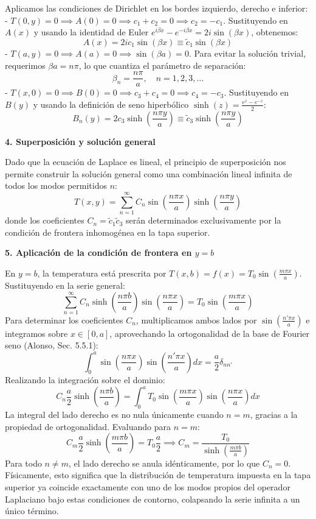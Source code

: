 \documentclass[a4paper]{article}
\begin{document}
Aplicamos las condiciones de Dirichlet en los bordes izquierdo, derecho e inferior:
- $T(0, y) = 0 \implies A(0) = 0 \implies c_1 + c_2 = 0 \implies c_2 = -c_1$.
Sustituyendo en $A(x)$ y usando la identidad de Euler $e^{i\beta x} - e^{-i\beta x} = 2i\sin(\beta x)$, obtenemos:
$$ A(x) = 2ic_1 \sin(\beta x) \equiv \tilde{c}_1 \sin(\beta x) $$
- $T(a, y) = 0 \implies A(a) = 0 \implies \sin(\beta a) = 0$.
Para evitar la solución trivial, requerimos $\beta a = n\pi$, lo que cuantiza el parámetro de separación:
$$ \beta_n = \frac{n\pi}{a}, \quad n = 1, 2, 3, \dots $$
- $T(x, 0) = 0 \implies B(0) = 0 \implies c_3 + c_4 = 0 \implies c_4 = -c_3$.
Sustituyendo en $B(y)$ y usando la definición de seno hiperbólico $\sinh(z) = \frac{e^z - e^{-z}}{2}$:
$$ B_n(y) = 2c_3 \sinh\left(\frac{n\pi y}{a}\right) \equiv \tilde{c}_3 \sinh\left(\frac{n\pi y}{a}\right) $$

\textbf{4. Superposición y solución general}

Dado que la ecuación de Laplace es lineal, el principio de superposición nos permite construir la solución general como una combinación lineal infinita de todos los modos permitidos $n$:
$$ T(x, y) = \sum_{n=1}^\infty C_n \sin\left(\frac{n\pi x}{a}\right) \sinh\left(\frac{n\pi y}{a}\right) $$
donde los coeficientes $C_n = \tilde{c}_1 \tilde{c}_3$ serán determinados exclusivamente por la condición de frontera inhomogénea en la tapa superior.

\textbf{5. Aplicación de la condición de frontera en $y=b$}

En $y=b$, la temperatura está prescrita por $T(x, b) = f(x) = T_0 \sin\left(\frac{m\pi x}{a}\right)$. Sustituyendo en la serie general:
$$ \sum_{n=1}^\infty C_n \sinh\left(\frac{n\pi b}{a}\right) \sin\left(\frac{n\pi x}{a}\right) = T_0 \sin\left(\frac{m\pi x}{a}\right) $$
Para determinar los coeficientes $C_n$, multiplicamos ambos lados por $\sin\left(\frac{n'\pi x}{a}\right)$ e integramos sobre $x \in [0, a]$, aprovechando la ortogonalidad de la base de Fourier seno (Alonso, Sec. 5.5.1):
$$ \int_0^a \sin\left(\frac{n\pi x}{a}\right) \sin\left(\frac{n'\pi x}{a}\right) dx = \frac{a}{2} \delta_{nn'} $$
Realizando la integración sobre el dominio:
$$ C_n \frac{a}{2} \sinh\left(\frac{n\pi b}{a}\right) = \int_0^a T_0 \sin\left(\frac{m\pi x}{a}\right) \sin\left(\frac{n\pi x}{a}\right) dx $$
La integral del lado derecho es no nula únicamente cuando $n=m$, gracias a la propiedad de ortogonalidad. Evaluando para $n=m$:
$$ C_m \frac{a}{2} \sinh\left(\frac{m\pi b}{a}\right) = T_0 \frac{a}{2} \implies C_m = \frac{T_0}{\sinh\left(\frac{m\pi b}{a}\right)} $$
Para todo $n \neq m$, el lado derecho se anula idénticamente, por lo que $C_n = 0$. Físicamente, esto significa que la distribución de temperatura impuesta en la tapa superior ya coincide exactamente con uno de los modos propios del operador Laplaciano bajo estas condiciones de contorno, colapsando la serie infinita a un único término.
\end{document}
